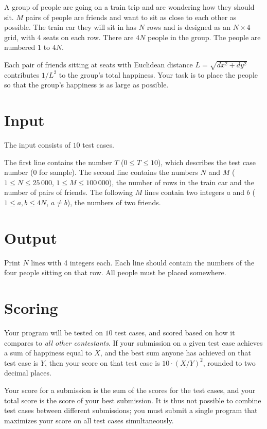 A group of people are going on a train trip and are wondering how they should sit.
$M$ pairs of people are friends and want to sit as close to each other as possible.
The train car they will sit in has $N$ rows and is designed as an $N \times 4$ grid, with 4 seats on each row.
There are $4N$ people in the group.
The people are numbered $1$ to $4N$.

Each pair of friends sitting at seats with Euclidean distance $L = \sqrt{dx^2 + dy^2}$
contributes $1/L^2$ to the group's total happiness.
Your task is to place the people so that the group's happiness is as large as possible.

\section*{Input}
The input consists of $10$ test cases.

The first line contains the number $T$ ($0 \le T \le 10$), which describes the test case number ($0$ for sample).
The second line contains the numbers $N$ and $M$ ($1 \le N \le 25\,000$, $1 \le M \le 100\,000$), the number of rows in the train car and the number of pairs of friends.
The following $M$ lines contain two integers $a$ and $b$ ($1 \le a,b \le 4N$, $a \ne b$), the numbers of two friends.

\section*{Output}
Print $N$ lines with 4 integers each.
Each line should contain the numbers of the four people sitting on that row.
All people must be placed somewhere.

\section*{Scoring}
Your program will be tested on $10$ test cases, and scored based on how it compares to \emph{all other contestants}.
If your submission on a given test case achieves a sum of happiness equal to $X$, and the best sum anyone has achieved on that test case is $Y$,
then your score on that test case is $10 \cdot (X / Y)^2$, rounded to two decimal places.

Your score for a submission is the sum of the scores for the test cases, and your total score is the score of your best submission.
It is thus not possible to combine test cases between different submissions; you must submit a single program that
maximizes your score on all test cases simultaneously.

